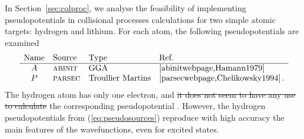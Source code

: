 \documentclass[10pt]{article}
\providecommand{\DIFaddtex}[1]{{\protect\color{blue}\uwave{#1}}} %
\providecommand{\DIFdeltex}[1]{{\protect\color{red}\sout{#1}}}                      %
\providecommand{\DIFaddbegin}{} %
\providecommand{\DIFaddend}{} %
\providecommand{\DIFdelbegin}{} %
\providecommand{\DIFdelend}{} %
\providecommand{\DIFadd}[1]{\texorpdfstring{\DIFaddtex{#1}}{#1}} %
\providecommand{\DIFdel}[1]{\texorpdfstring{\DIFdeltex{#1}}{}} %
\begin{document}
In Section~\ref{sec:colproc}, we analyse the feasibility of 
implementing pseudopotentials in collisional processes calculations 
for two simple atomic targets: hydrogen and lithium. For each atom, 
the following pseudopotentials are examined
\begin{equation}
 \begin{array}{clll}
  \mbox{Name} & \mbox{Source} & \mbox{Type} & \mbox{Ref.} \\
  \hline  
  A & \mbox{\sc abinit} & \mbox{GGA} & \cite{abinitwebpage,Hamann1979} \\
  P & \mbox{\sc parsec} & \mbox{Troullier Martins} & \cite{parsecwebpage,Chelikowsky1994}\,.
 \end{array}
 \label{eq:pseudosources}
\end{equation}
The hydrogen atom has only one electron, and \DIFdelbegin \DIFdel{it does not seem to have 
any use to calculate }\DIFdelend the corresponding 
pseudopotential \DIFaddbegin \DIFadd{is not essential}\DIFaddend . However, the hydrogen 
pseudopotentials from (\ref{eq:pseudosources}) reproduce with high 
accuracy the main features of the wavefunctions, even for excited 
states.
\end{document}
